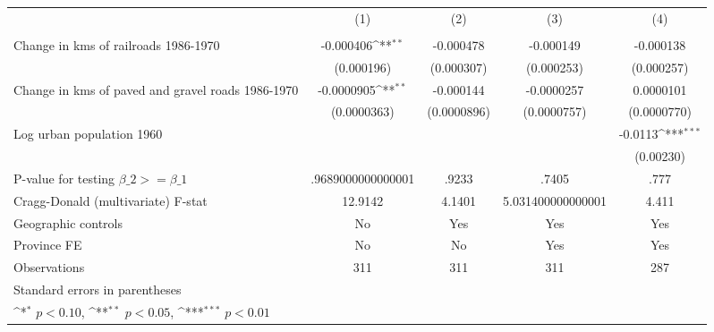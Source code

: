 {
\def\sym#1{\ifmmode^{#1}\else\(^{#1}\)\fi}
\begin{tabular}{l*{4}{c}}
\hline\hline
                &\multicolumn{1}{c}{(1)}&\multicolumn{1}{c}{(2)}&\multicolumn{1}{c}{(3)}&\multicolumn{1}{c}{(4)}\\
                &\multicolumn{1}{c}{}&\multicolumn{1}{c}{}&\multicolumn{1}{c}{}&\multicolumn{1}{c}{}\\
\hline
Change in kms of railroads 1986-1970&-0.000406\sym{**} &-0.000478         &-0.000149         &-0.000138         \\
                &(0.000196)         &(0.000307)         &(0.000253)         &(0.000257)         \\
[1em]
Change in kms of paved and gravel roads 1986-1970&-0.0000905\sym{**} &-0.000144         &-0.0000257         &0.0000101         \\
                &(0.0000363)         &(0.0000896)         &(0.0000757)         &(0.0000770)         \\
[1em]
Log urban population 1960&                  &                  &                  &  -0.0113\sym{***}\\
                &                  &                  &                  &(0.00230)         \\
\hline
P-value for testing $\beta\_{2} >= \beta\_{1}$&.9689000000000001         &    .9233         &    .7405         &     .777         \\
Cragg-Donald (multivariate) F-stat&  12.9142         &   4.1401         &5.031400000000001         &    4.411         \\
Geographic controls&       No         &      Yes         &      Yes         &      Yes         \\
Province FE     &       No         &       No         &      Yes         &      Yes         \\
Observations    &      311         &      311         &      311         &      287         \\
\hline\hline
\multicolumn{5}{l}{\footnotesize Standard errors in parentheses}\\
\multicolumn{5}{l}{\footnotesize \sym{*} \(p<0.10\), \sym{**} \(p<0.05\), \sym{***} \(p<0.01\)}\\
\end{tabular}
}
